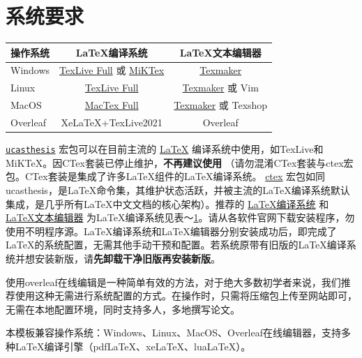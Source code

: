 {\section{系统要求}\label{sec:system}
\begin{table}
    \footnotesize%
    \setlength{\tabcolsep}{4pt}%
    \renewcommand{\arraystretch}{1.5}%
    \centering
    \begin{tabular}{lcc}
        \hline
        操作系统 & LaTeX编译系统 & LaTeX文本编辑器\\
        \hline
        Windows & \href{https://www.tug.org/texlive/acquire-netinstall.html}{TexLive Full} 或 \href{https://miktex.org/download}{MiKTex} & \href{http://www.xm1math.net/texmaker/}{Texmaker}\\
        Linux & \href{https://www.tug.org/texlive/acquire-netinstall.html}{TexLive Full} & \href{http://www.xm1math.net/texmaker/}{Texmaker} 或 Vim\\
        MacOS & \href{https://www.tug.org/mactex/}{MacTex Full} & \href{http://www.xm1math.net/texmaker/}{Texmaker} 或 Texshop\\
        Overleaf & XeLaTeX+TexLive2021 & Overleaf \\
        \hline
    \end{tabular}
    \label{tab:compiler}
\end{table}
\href{https://github.com/mohuangrui/ucasthesis}{\texttt{ucasthesis}} 宏包可以在目前主流的 \href{https://en.wikibooks.org/wiki/LaTeX/Introduction}{LaTeX} 编译系统中使用，如TexLive和MiKTeX。因CTex套装已停止维护，\textbf{不再建议使用} （请勿混淆CTex套装与ctex宏包。CTex套装是集成了许多LaTeX组件的LaTeX编译系统。 \href{https://ctan.org/pkg/ctex?lang=en}{ctex} 宏包如同ucasthesis，是LaTeX命令集，其维护状态活跃，并被主流的LaTeX编译系统默认集成，是几乎所有LaTeX中文文档的核心架构）。推荐的 \href{https://en.wikibooks.org/wiki/LaTeX/Installation}{LaTeX编译系统} 和 \href{https://en.wikibooks.org/wiki/LaTeX/Installation}{LaTeX文本编辑器} 为LaTeX编译系统见表～\ref{tab:compiler}。请从各软件官网下载安装程序，勿使用不明程序源。LaTeX编译系统和LaTeX编辑器分别安装成功后，即完成了LaTeX的系统配置，无需其他手动干预和配置。若系统原带有旧版的LaTeX编译系统并想安装新版，请\textbf{先卸载干净旧版再安装新版}。

使用overleaf在线编辑是一种简单有效的方法，对于绝大多数初学者来说，我们推荐使用这种无需进行系统配置的方式。在操作时，只需将压缩包上传至网站即可，无需在本地配置环境，同时支持多人，多地撰写论文。

本模板兼容操作系统：Windows、Linux、MacOS、Overleaf在线编辑器，支持多种LaTeX编译引擎（pdfLaTeX、xeLaTeX、luaLaTeX）。}

